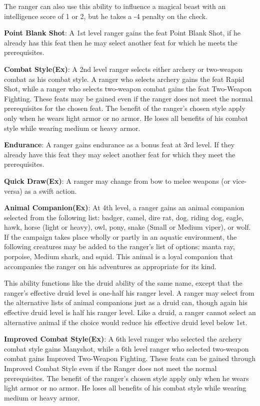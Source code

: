 The ranger can also use this ability to influence a magical beast with an intelligence score of 1 or 2, but he takes a -4 penalty on the check.

\textbf{Point Blank Shot}: A 1st level ranger gains the feat Point Blank Shot, if he already has this feat then he may select another feat for which he meets the prerequisites.

\textbf{Combat Style(Ex)}: A 2nd level ranger selects either archery or two-weapon combat as his combat style. A ranger who selects archery gains the feat Rapid Shot, while a ranger who selects two-weapon combat gains the feat Two-Weapon Fighting. These feats may be gained even if the ranger does not meet the normal prerequisites for the chosen feat. The benefit of the ranger's chosen style apply only when he wears light armor or no armor. He loses all benefits of his combat style while wearing medium or heavy armor.

\textbf{Endurance}: A ranger gains endurance as a bonus feat at 3rd level. If they already have this feat they may select another feat for which they meet the prerequisites. 

\textbf{Quick Draw(Ex)}: A ranger may change from bow to melee weapons (or vice-versa) as a swift action. 

\textbf{Animal Companion(Ex)}: At 4th level, a ranger gains an animal companion selected from the following list: badger, camel, dire rat, dog, riding dog, eagle, hawk, horse (light or heavy), owl, pony, snake (Small or Medium viper), or wolf. If the campaign takes place wholly or partly in an aquatic environment, the following creatures may be added to the ranger’s list of options: manta ray, porpoise, Medium shark, and squid. This animal is a loyal companion that accompanies the ranger on his adventures as appropriate for its kind.

This ability functions like the druid ability of the same name, except that the ranger’s effective druid level is one-half his ranger level. A ranger may select from the alternative lists of animal companions just as a druid can, though again his effective druid level is half his ranger level. Like a druid, a ranger cannot select an alternative animal if the choice would reduce his effective druid level below 1st.

\textbf{Improved Combat Style(Ex)}: A 6th level ranger who selected the archery combat style gains Manyshot, while a 6th level ranger who selected two-weapon combat gains Improved Two-Weapon Fighting. These feats can be gained through Improved Combat Style even if the Ranger does not meet the normal prerequisites. The benefit of the ranger's chosen style apply only when he wears light armor or no armor. He loses all benefits of his combat style while wearing medium or heavy armor.